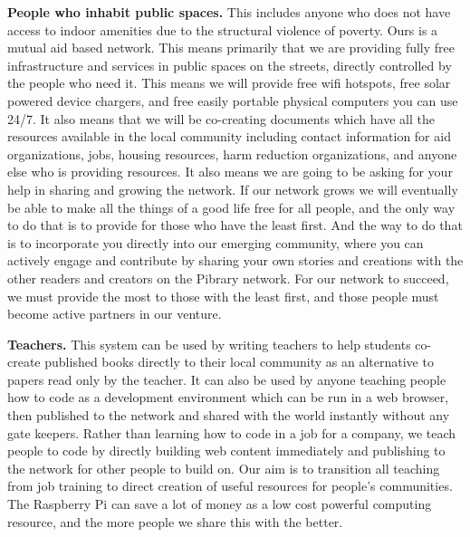 \textbf{People who inhabit public spaces.} This includes anyone who does
not have access to indoor amenities due to the structural violence of
poverty. Ours is a mutual aid based network. This means primarily that
we are providing fully free infrastructure and services in public spaces
on the streets, directly controlled by the people who need it. This
means we will provide free wifi hotspots, free solar powered device
chargers, and free easily portable physical computers you can use 24/7.
It also means that we will be co-creating documents which have all the
resources available in the local community including contact information
for aid organizations, jobs, housing resources, harm reduction
organizations, and anyone else who is providing resources. It also means
we are going to be asking for your help in sharing and growing the
network. If our network grows we will eventually be able to make all the
things of a good life free for all people, and the only way to do that
is to provide for those who have the least first. And the way to do that
is to incorporate you directly into our emerging community, where you
can actively engage and contribute by sharing your own stories and
creations with the other readers and creators on the Pibrary network.
For our network to succeed, we must provide the most to those with the
least first, and those people must become active partners in our
venture.

\textbf{Teachers.} This system can be used by writing teachers to help
students co-create published books directly to their local community as
an alternative to papers read only by the teacher. It can also be used
by anyone teaching people how to code as a development environment which
can be run in a web browser, then published to the network and shared
with the world instantly without any gate keepers. Rather than learning
how to code in a job for a company, we teach people to code by directly
building web content immediately and publishing to the network for other
people to build on. Our aim is to transition all teaching from job
training to direct creation of useful resources for people's
communities. The Raspberry Pi can save a lot of money as a low cost
powerful computing resource, and the more people we share this with the
better.

